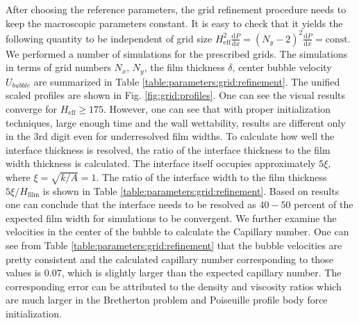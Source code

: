 \documentclass{article}
\begin{document}
After choosing the reference parameters, the grid refinement procedure
needs to keep the macroscopic parameters constant.  It is easy to check
that it yields the following quantity to
be independent of grid size
$H_{\mathrm{eff}}^2\frac{\mathrm{d}P}{\mathrm{d}x}=(N_y-2)^2\frac{\mathrm{d}P}{\mathrm{d}
x } = \mathrm{const}$. We performed a number of simulations for the prescribed grids. The
simulations in terms of grid numbers $N_x$, $N_y$, the film thickness $\delta$, center bubble
velocity $U_{bubble}$ are summarized in Table \ref{table:parameters:grid:refinement}.
The unified scaled profiles are shown in Fig. \ref{fig:grid:profiles}. One can
see the visual results converge for $H_{\mathrm{eff}}\geq 175$. However, one can see
that with proper initialization techniques, large enough time and the wall
wettability, results are different only in the 3rd digit even for
underresolved film widths. To calculate how well the interface thickness is
resolved, the ratio of the interface thickness to the film width thickness is calculated. The
interface itself occupies approximately $5 \xi$, where
$\xi=\sqrt{k/A}=1$. The ratio of the interface width to the film thickness $5\xi/H_{\mathrm{film}}$
 is shown in Table \ref{table:parameters:grid:refinement}. Based on results one can conclude that
 the interface needs to be resolved as $40-50$ percent of the
expected film width for simulations to be convergent. We further examine the
velocities in the center of the bubble to calculate the Capillary number. One can see from Table
\ref{table:parameters:grid:refinement} that the bubble velocities are pretty consistent and the
calculated capillary number corresponding to those values is $0.07$, which is slightly
larger than the expected capillary number. The corresponding error can be
attributed to the density and viscosity ratios which are much larger in the
Bretherton problem and Poiseuille profile body force initialization.
\end{document}
